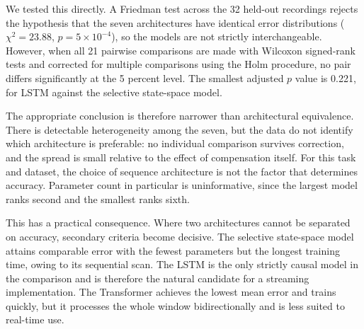 We tested this directly. A Friedman test across the 32 held-out recordings
rejects the hypothesis that the seven architectures have identical error
distributions ($\chi^2 = 23.88$, $p = 5 \times 10^{-4}$), so the models are not
strictly interchangeable. However, when all 21 pairwise comparisons are made with
Wilcoxon signed-rank tests and corrected for multiple comparisons using the Holm
procedure, no pair differs significantly at the 5 percent level. The smallest
adjusted $p$ value is 0.221, for LSTM against the selective state-space model.

The appropriate conclusion is therefore narrower than architectural equivalence.
There is detectable heterogeneity among the seven, but the data do not identify
which architecture is preferable: no individual comparison survives correction,
and the spread is small relative to the effect of compensation itself. For this
task and dataset, the choice of sequence architecture is not the factor that
determines accuracy. Parameter count in particular is uninformative, since the
largest model ranks second and the smallest ranks sixth.

This has a practical consequence. Where two architectures cannot be separated on
accuracy, secondary criteria become decisive. The selective state-space model
attains comparable error with the fewest parameters but the longest training
time, owing to its sequential scan. The LSTM is the only strictly causal model in
the comparison and is therefore the natural candidate for a streaming
implementation. The Transformer achieves the lowest mean error and trains
quickly, but it processes the whole window bidirectionally and is less suited to
real-time use.
